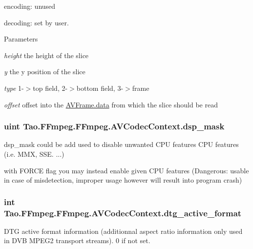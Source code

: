 \begin{DoxyItemize}
\item encoding: unused
\item decoding: set by user. 
\begin{DoxyParams}{Parameters}
\item[{\em height}]the height of the slice \item[{\em y}]the y position of the slice \item[{\em type}]1-\/$>$top field, 2-\/$>$bottom field, 3-\/$>$frame \item[{\em offset}]offset into the \hyperlink{struct_tao_1_1_f_fmpeg_1_1_f_fmpeg_1_1_a_v_frame_abbc10f506e044b7b2ecd06c4759bc18c}{AVFrame.data} from which the slice should be read \end{DoxyParams}

\end{DoxyItemize}\hypertarget{struct_tao_1_1_f_fmpeg_1_1_f_fmpeg_1_1_a_v_codec_context_a35784a9d04118f782d334ae0e1f53f52}{
\subsubsection[{dsp\_\-mask}]{\setlength{\rightskip}{0pt plus 5cm}uint {\bf Tao.FFmpeg.FFmpeg.AVCodecContext.dsp\_\-mask}}}
\label{struct_tao_1_1_f_fmpeg_1_1_f_fmpeg_1_1_a_v_codec_context_a35784a9d04118f782d334ae0e1f53f52}
dsp\_\-mask could be add used to disable unwanted CPU features CPU features (i.e. MMX, SSE. ...)

with FORCE flag you may instead enable given CPU features (Dangerous: usable in case of misdetection, improper usage however will result into program crash) \hypertarget{struct_tao_1_1_f_fmpeg_1_1_f_fmpeg_1_1_a_v_codec_context_ad73eda5c004c023376efb910b4b82102}{
\subsubsection[{dtg\_\-active\_\-format}]{\setlength{\rightskip}{0pt plus 5cm}int {\bf Tao.FFmpeg.FFmpeg.AVCodecContext.dtg\_\-active\_\-format}}}
\label{struct_tao_1_1_f_fmpeg_1_1_f_fmpeg_1_1_a_v_codec_context_ad73eda5c004c023376efb910b4b82102}
DTG active format information (additionnal aspect ratio information only used in DVB MPEG2 transport streams). 0 if not set.


